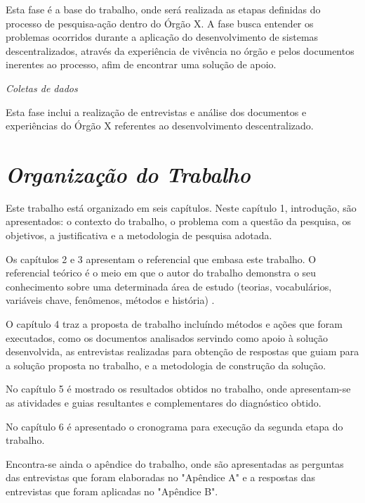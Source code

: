 Esta fase é a base do trabalho, onde será realizada as etapas definidas do processo de pesquisa-ação dentro do Órgão X. A fase busca entender os problemas ocorridos durante a aplicação do desenvolvimento de sistemas descentralizados, através da experiência de vivência no órgão e pelos documentos inerentes ao processo, afim de encontrar uma solução de apoio.

\textit{Coletas de dados}

Esta fase inclui a realização de entrevistas e análise dos documentos e experiências do Órgão X referentes ao desenvolvimento descentralizado.

\section{\textit{Organização do Trabalho}}

Este trabalho está organizado em seis capítulos. Neste capítulo 1, introdução, são
apresentados: o contexto do trabalho, o problema com a questão da pesquisa, os
objetivos, a justificativa e a metodologia de pesquisa adotada.

Os capítulos 2 e 3 apresentam o referencial que embasa este trabalho. O referencial teórico é o meio em que o autor do trabalho demonstra o seu conhecimento sobre uma determinada área de estudo (teorias, vocabulários, variáveis chave, fenômenos, métodos e história) \cite{randolph2009}.

O capítulo 4 traz a proposta de trabalho incluíndo métodos e ações que foram executados, como os documentos analisados servindo como apoio à solução desenvolvida, as entrevistas realizadas para obtenção de respostas que guiam para a solução proposta no trabalho, e a metodologia de construção da solução.

No capítulo 5 é mostrado os resultados obtidos no trabalho, onde apresentam-se as atividades e guias resultantes e complementares do diagnóstico obtido.

No capítulo 6 é apresentado o cronograma para execução da segunda etapa do trabalho.

Encontra-se ainda o apêndice do trabalho, onde são apresentadas as perguntas das entrevistas que foram elaboradas no "Apêndice A" e a respostas das entrevistas que foram aplicadas no "Apêndice B".

